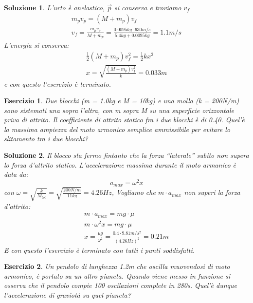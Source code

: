 \documentclass{article}
\newtheorem{es}{Esercizio}[section]
\newtheorem{sol}{Soluzione}[section]
\begin{document}
\begin{sol}
  L'urto è anelastico, $\vec{p}$ si conserva e troviamo $v_f$
  \begin{equation*}
    \begin{matrix}
      m_pv_p=(M+m_p)v_f\\
      v_f=\frac{m_pv_p}{M+m_p}=\frac{0.0095kg\cdot 630m/s}{5.4kg+0.0095kg}=\boxed{1.1m/s}
    \end{matrix}
  \end{equation*}
  L'energia si conserva:
  \begin{equation*}
    \begin{matrix}
      \frac{1}{2}(M+m_p)v_f^2=\frac{1}{2}kx^2\\
      x=\sqrt{\frac{(M+m_p)v_f^2}{k}}=\boxed{0.033m}
    \end{matrix}
  \end{equation*}
  e con questo l'esercizio è terminato.
\end{sol}
\begin{es}
  Due blocchi (m = 1.0kg e M = 10kg) e una molla (k = 200N/m) sono sistemati una sopra l'altra, con m sopra M su una superficie orizzontale priva di attrito. Il coefficiente di attrito statico fra i due blocchi è di 0.40. Quel'è la massima ampiezza del moto armonico semplice ammissibile per evitare lo slitamento tra i due blocchi?
\end{es}
\begin{sol}
  Il blocco sta fermo fintanto che la forza ``laterale'' subito non supera lo forza d'attrito statico. L'accelerazione massima durante il moto armanico è data da:
  \begin{equation*}
    a_{max}=\omega^2x
  \end{equation*}
  con $\omega = \sqrt{\frac{k}{M_{tot}}}=\sqrt{\frac{200N/m}{11kg}}=4.26Hz$, Vogliamo che $m\cdot a_{max}$ non superi la forza d'attrito:
  \begin{equation*}
    \begin{matrix}
      m\cdot a_{max}=mg\cdot \mu\\
      m\cdot \omega^2x=mg\cdot \mu\\
      x = \frac{\mu g}{\omega^2}=\frac{0.4\cdot 9.81m/s^2}{(4.26Hz)^2}=\boxed{0.21m}
    \end{matrix}
  \end{equation*}
  E con questo l'esercizio è terminato con tutti i punti soddisfatti.
\end{sol}
\begin{es}
  Un pendolo di lunghezza 1.2m che oscilla muovendosi di moto armonico, è portato su un altro pianeta. Quando viene messo in funzione si osserva che il pendolo compie 100 oscilazioni complete in 280s. Quel'è dunque l'accelerazione di graviotà su quel pianeta?
\end{es}
\end{document}

